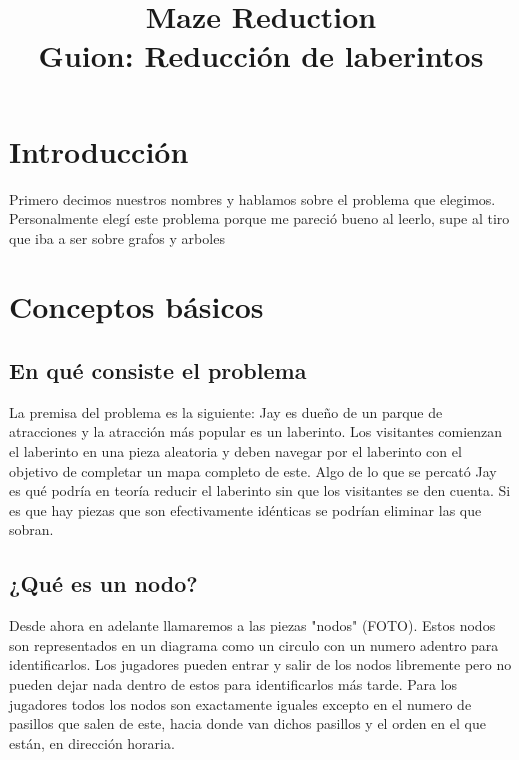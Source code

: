 \documentclass[conference]{IEEEtran}
\begin{document}
\title{Maze Reduction\\
{\footnotesize \textsuperscript{}Guion: Reducción de laberintos}
}

\author{
\and
{}
}

\maketitle

\section{Introducción}
Primero decimos nuestros nombres y hablamos sobre el problema que elegimos.
Personalmente elegí este problema porque me pareció bueno al leerlo, supe al tiro que iba a ser sobre grafos y arboles

\section{Conceptos básicos}

\subsection{En qué consiste el problema}

La premisa del problema es la siguiente: Jay es dueño de un parque de atracciones
y la atracción más popular es un laberinto. Los visitantes comienzan el laberinto en una pieza
aleatoria y deben navegar por el laberinto con el objetivo de completar un mapa completo de este.
Algo de lo que se percató Jay es qué podría en teoría reducir el laberinto sin que los visitantes se den cuenta.
Si es que hay piezas que son efectivamente idénticas se podrían eliminar las que sobran.

\subsection{¿Qué es un nodo?}
Desde ahora en adelante llamaremos a las piezas "nodos" (FOTO).
Estos nodos son representados en un diagrama como un circulo con un numero adentro para identificarlos.
Los jugadores pueden entrar y salir de los nodos libremente pero no pueden dejar nada dentro de estos para identificarlos más tarde.
Para los jugadores todos los nodos son exactamente iguales excepto en el numero de pasillos que salen de este, hacia donde van dichos pasillos
y el orden en el que están, en dirección horaria.
\end{document}
